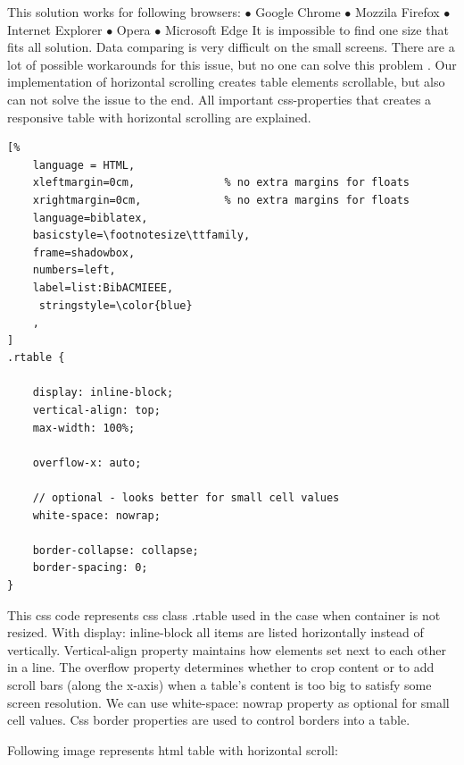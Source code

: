 This solution works for following browsers:
\newline $\bullet$ Google Chrome
\newline $\bullet$ Mozzila Firefox
\newline $\bullet$ Internet Explorer
\newline $\bullet$ Opera
\newline $\bullet$ Microsoft Edge
\newline
\newline It is impossible to find one size that fits all solution. Data comparing is very difficult on the small screens.
There are a lot of possible workarounds for this issue, but no one can solve this problem \parencite{HS_1}.
Our implementation of horizontal scrolling creates table elements scrollable, but also can not solve the issue to the end\parencite{HS_1}.
All important css-properties that creates a responsive table with horizontal scrolling are explained.

\begin{lstlisting}[%
    language = HTML,
    xleftmargin=0cm,              % no extra margins for floats
    xrightmargin=0cm,             % no extra margins for floats
    language=biblatex,
    basicstyle=\footnotesize\ttfamily,
    frame=shadowbox,
    numbers=left,
    label=list:BibACMIEEE,
     stringstyle=\color{blue}
    ,
]
.rtable {

    display: inline-block;
    vertical-align: top;
    max-width: 100%;

    overflow-x: auto;

    // optional - looks better for small cell values
    white-space: nowrap;

    border-collapse: collapse;
    border-spacing: 0;
}

\end{lstlisting}

This css code represents css class .rtable used in the case when container is not resized.
With display: inline-block all items are listed horizontally instead of vertically.
Vertical-align property maintains how elements set next to each other in a line.
The overflow property determines whether to crop content or to add scroll bars (along the x-axis) when a table's content is too big to satisfy some screen resolution.
We can use white-space: nowrap property as optional for small cell values.
Css border properties are used to control borders into a table\parencite{HS_1}.

Following image represents html table with horizontal scroll:

